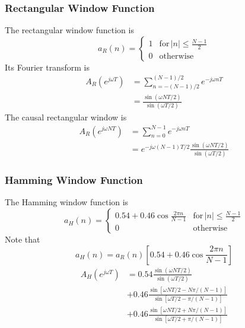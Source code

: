 \documentclass[11pt]{book}
\theoremstyle{example}
\begin{document}
\subsubsection{Rectangular Window Function}
The rectangular window function is
\begin{equation}
	a_R(n)=
	\begin{cases}
		1 & \mathrm{for}\,|n|\leq\frac{N-1}{2}\\
		0 & \mathrm{otherwise}
	\end{cases}
\end{equation}
Its Fourier transform is
\begin{equation}
	\begin{split}
		A_R(e^{j{\omega}T})&=\sum_{n=-(N-1)/2}^{(N-1)/2}{e^{-j{\omega}nT}}\\
		&=\frac{\sin{({\omega}NT/2)}}{\sin{({\omega}T/2)}}
	\end{split}
\end{equation}
The causal rectangular window is
\begin{equation}
	\begin{split}
		A_R(e^{j{\omega}NT})&=\sum_{n=0}^{N-1}{e^{-j{\omega}nT}}\\
		&=e^{-j\omega(N-1)T/2}\frac{\sin{({\omega}NT/2)}}{\sin{({\omega}T/2)}}
	\end{split}
\end{equation}

\subsubsection{Hamming Window Function}
The Hamming window function is
\begin{equation}
	a_H(n)=
	\begin{cases}
		0.54+0.46\cos{\frac{2{\pi}n}{N-1}} & \mathrm{for}\,|n|\leq\frac{N-1}{2}\\
		0 & \mathrm{otherwise}
	\end{cases}
\end{equation}
Note that
\begin{equation}
	a_H(n)=a_R(n)\left[0.54+0.46\cos{\frac{2{\pi}n}{N-1}}\right]
\end{equation}
\begin{equation}
	\begin{split}
		A_H(e^{j{\omega}T})&=0.54\frac{\sin{({\omega}NT/2)}}{\sin{({\omega}T/2)}}\\
		&+0.46\frac{\sin{[{\omega}NT/2-N\pi/(N-1)]}}{\sin{[{\omega}T/2-\pi/(N-1)]}}\\
		&+0.46\frac{\sin{[{\omega}NT/2+N\pi/(N-1)]}}{\sin{[{\omega}T/2+\pi/(N-1)]}}
	\end{split}
\end{equation}
\end{document}

